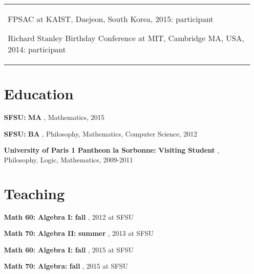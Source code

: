 \documentclass[margin,line,pifont,palatino,courier]{res}
\newenvironment{list1}{
  \begin{list}{\label{ } }{
      \setlength{\itemsep}{0in}
      \setlength{\parsep}{0in} \setlength{\parskip}{0in}
      \setlength{\topsep}{0in} \setlength{\partopsep}{0in}
      \setlength{\leftmargin}{0.0in} } }{\end{list} }
\begin{document}
\begin{resume}
\begin{tabular}{@{}p{5in}}
\begin{list1}
         \item  { FPSAC }  at KAIST, Daejeon, South Korea, 2015:  participant
      \vspace{.2em}
      
         \item  { Richard Stanley Birthday Conference }  at MIT, Cambridge MA, USA, 2014:  participant
      \vspace{.2em}
      
    \end{list1}
  \end{tabular}


\section{\sc Education} 
  \begin{list1}
    
    
        \item  {\bf SFSU:}\textbf{ MA }, Mathematics, 2015

          
    
        \item  {\bf SFSU:}\textbf{ BA }, Philosophy, Mathematics, Computer Science, 2012

          
    
        \item  {\bf University of Paris 1 Pantheon la Sorbonne:}\textbf{ Visiting Student }, Philosophy, Logic, Mathematics, 2009-2011

          
    

  \end{list1}


\section{\sc Teaching} 
  \begin{list1}
    
    
        \item  {\bf Math 60: Algebra I:}\textbf{ fall  },  2012 at SFSU
    
        \item  {\bf Math 70: Algebra II:}\textbf{ summer  },  2013 at SFSU
    
        \item  {\bf Math 60: Algebra I:}\textbf{ fall  },  2015 at SFSU
    
        \item  {\bf Math 70: Algebra:}\textbf{ fall  },  2015 at SFSU
    

\end{list1}
\end{resume}
\end{document}

